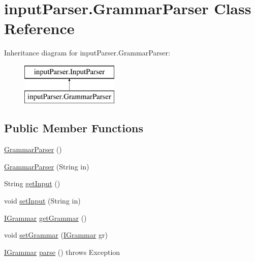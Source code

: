 \hypertarget{classinput_parser_1_1_grammar_parser}{\section{input\-Parser.\-Grammar\-Parser Class Reference}
\label{classinput_parser_1_1_grammar_parser}
}
Inheritance diagram for input\-Parser.\-Grammar\-Parser\-:\begin{figure}[H]
\begin{center}
\leavevmode
\includegraphics[height=2.000000cm]{classinput_parser_1_1_grammar_parser}
\end{center}
\end{figure}
\subsection*{Public Member Functions}
\begin{DoxyCompactItemize}
\item 
\hyperlink{classinput_parser_1_1_grammar_parser_a1547c96840feb7366a88f9787521e531}{Grammar\-Parser} ()
\item 
\hyperlink{classinput_parser_1_1_grammar_parser_a312bf8eb7edf616d0aad284cece1a1b4}{Grammar\-Parser} (String in)
\item 
String \hyperlink{classinput_parser_1_1_grammar_parser_a33d7f99b44d781d0846da56bfad29955}{get\-Input} ()
\item 
void \hyperlink{classinput_parser_1_1_grammar_parser_a73268997b2814a6208dc7be58be247a8}{set\-Input} (String in)
\item 
\hyperlink{interfacecontext_free_1_1grammar_1_1_i_grammar}{I\-Grammar} \hyperlink{classinput_parser_1_1_grammar_parser_afd21a25080f1a18a3564cc86850f0b57}{get\-Grammar} ()
\item 
void \hyperlink{classinput_parser_1_1_grammar_parser_ae8cc16b73d8645ca74a5880388a250bb}{set\-Grammar} (\hyperlink{interfacecontext_free_1_1grammar_1_1_i_grammar}{I\-Grammar} gr)
\item 
\hyperlink{interfacecontext_free_1_1grammar_1_1_i_grammar}{I\-Grammar} \hyperlink{classinput_parser_1_1_grammar_parser_a46c33fdad541b475abc31e44d56eb507}{parse} ()  throws Exception
\end{DoxyCompactItemize}
